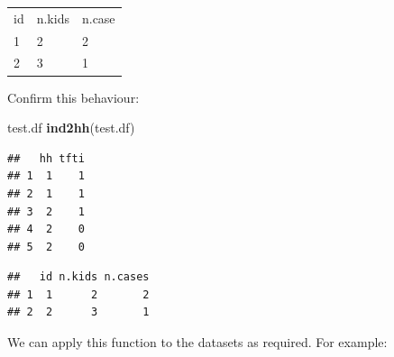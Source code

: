 \documentclass[12pt,a4paper]{book}
\newenvironment{Shaded}{\begin{snugshade}}{\end{snugshade}}
\newcommand{\KeywordTok}[1]{\textcolor[rgb]{0.13,0.29,0.53}{\textbf{#1}}}
\newcommand{\NormalTok}[1]{#1}
\theoremstyle{definition}
\theoremstyle{definition}
\theoremstyle{definition}
\theoremstyle{remark}
\begin{document}
\begin{longtable}[]{@{}lll@{}}
\toprule
\endhead
\begin{minipage}[t]{0.08\columnwidth}\raggedright
id\strut
\end{minipage} & \begin{minipage}[t]{0.14\columnwidth}\raggedright
n.kids\strut
\end{minipage} & \begin{minipage}[t]{0.14\columnwidth}\raggedright
n.case\strut
\end{minipage}\tabularnewline
\begin{minipage}[t]{0.08\columnwidth}\raggedright
1\strut
\end{minipage} & \begin{minipage}[t]{0.14\columnwidth}\raggedright
2\strut
\end{minipage} & \begin{minipage}[t]{0.14\columnwidth}\raggedright
2\strut
\end{minipage}\tabularnewline
\begin{minipage}[t]{0.08\columnwidth}\raggedright
2\strut
\end{minipage} & \begin{minipage}[t]{0.14\columnwidth}\raggedright
3\strut
\end{minipage} & \begin{minipage}[t]{0.14\columnwidth}\raggedright
1\strut
\end{minipage}\tabularnewline
\bottomrule
\end{longtable}

Confirm this behaviour:

\begin{Shaded}
\begin{Highlighting}[]
\NormalTok{test.df}
\KeywordTok{ind2hh}\NormalTok{(test.df)}
\end{Highlighting}
\end{Shaded}

\begin{verbatim}
##   hh tfti
## 1  1    1
## 2  1    1
## 3  2    1
## 4  2    0
## 5  2    0
\end{verbatim}

\begin{verbatim}
##   id n.kids n.cases
## 1  1      2       2
## 2  2      3       1
\end{verbatim}

We can apply this function to the datasets as required. For example:
\end{document}
